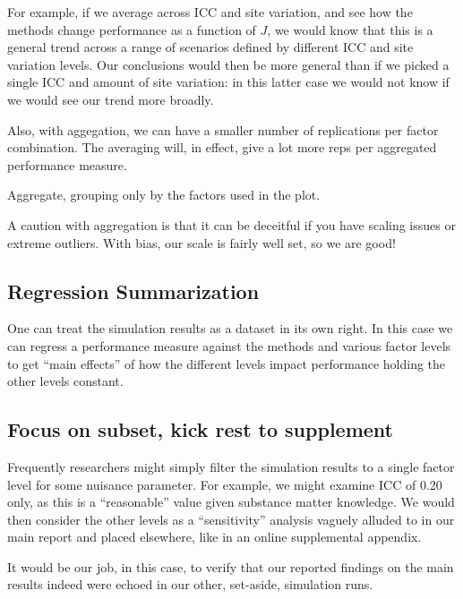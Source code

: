 \documentclass[
]{book}
\begin{document}
For example, if we average across ICC and site variation, and see how the methods change performance as a function of \(J\), we would know that this is a general trend across a range of scenarios defined by different ICC and site variation levels.
Our conclusions would then be more general than if we picked a single ICC and amount of site variation: in this latter case we would not know if we would see our trend more broadly.

Also, with aggegation, we can have a smaller number of replications per factor combination.
The averaging will, in effect, give a lot more reps per aggregated performance measure.

Aggregate, grouping only by the factors used in the plot.

A caution with aggregation is that it can be deceitful if you have scaling issues or extreme outliers.
With bias, our scale is fairly well set, so we are good!

\hypertarget{regression-summarization}{%
\subsection{Regression Summarization}\label{regression-summarization}}

One can treat the simulation results as a dataset in its own right.
In this case we can regress a performance measure against the methods and various factor levels to get ``main effects'' of how the different levels impact performance holding the other levels constant.

\hypertarget{focus-on-subset-kick-rest-to-supplement}{%
\subsection{Focus on subset, kick rest to supplement}\label{focus-on-subset-kick-rest-to-supplement}}

Frequently researchers might simply filter the simulation results to a single factor level for some nuisance parameter.
For example, we might examine ICC of 0.20 only, as this is a ``reasonable'' value given substance matter knowledge.
We would then consider the other levels as a ``sensitivity'' analysis vaguely alluded to in our main report and placed elsewhere, like in an online supplemental appendix.

It would be our job, in this case, to verify that our reported findings on the main results indeed were echoed in our other, set-aside, simulation runs.
\end{document}
